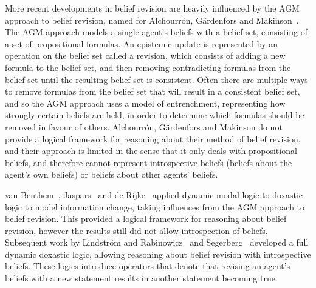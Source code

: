 More recent developments in belief revision are heavily influenced by the AGM approach to belief revision, named for Alchourr{\'o}n, G{\"a}rdenfors and Makinson~\cite{alchourron:1985}.
The AGM approach models a single agent's beliefs with a belief set, consisting of a set of propositional formulas.
An epistemic update is represented by an operation on the belief set called a revision, which consists of adding a new formula to the belief set, and then removing contradicting formulas from the belief set until the resulting belief set is consistent.
Often there are multiple ways to remove formulas from the belief set that will result in a consistent belief set, and so the AGM approach uses a model of entrenchment, representing how strongly certain beliefs are held, in order to determine which formulas should be removed in favour of others.
Alchourr{\'o}n, G{\"a}rdenfors and Makinson do not provide a logical framework for reasoning about their method of belief revision, and their approach is limited in the sense that it only deals with propositional beliefs, and therefore cannot represent introspective beliefs (beliefs about the agent's own beliefs) or beliefs about other agents' beliefs. 

van Benthem~\cite{vanbenthem:1989, vanbenthem:1994, vanbenthem:1996}, Jaspars~\cite{jaspars:1994} and de Rijke~\cite{derijke:1994} applied dynamic modal logic to doxastic logic to model information change, taking influences from the AGM approach to belief revision.
This provided a logical framework for reasoning about belief revision, however the results still did not allow introspection of beliefs. 
Subsequent work by Lindstr{\"o}m and Rabinowicz~\cite{lindstrom:1999a, lindstrom:1999b} and Segerberg~\cite{segerberg:1999a, segerberg:1999b} developed a full dynamic doxastic logic, allowing reasoning about belief revision with introspective beliefs.
These logics introduce operators that denote that revising an agent's beliefs with a new statement results in another statement becoming true.

